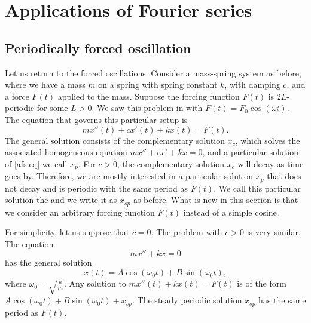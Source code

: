 \documentclass[12pt]{book}
\begin{document}

\sectionnewpage
\section{Applications of Fourier series}


\subsection{Periodically forced oscillation}

\begin{diffyfloatingfigure}{2.0in}{2.3in}
\noindent
{}
\end{diffyfloatingfigure}
Let us return to the forced oscillations.  Consider a mass-spring system as
before, where we have a mass $m$
on a spring with spring constant $k$,
with damping $c$, and a force $F(t)$ applied to the mass.  Suppose 
the forcing function $F(t)$ is $2L$-periodic for some $L > 0$.
We saw
this problem in  with $F(t) = F_0 \cos (\omega t)$.  The
equation that governs this particular setup is
\begin{equation} \label{afs:eq}
mx''(t) + cx'(t) + kx(t) = F(t) .
\end{equation}
The general solution consists of the complementary solution $x_c$, which
solves the associated homogeneous equation $mx'' + cx' + kx = 0$, and
a particular solution of \eqref{afs:eq} we call $x_p$.  For $c > 0$,
the complementary solution $x_c$ will decay as time goes by.
Therefore,
we are mostly interested
in a particular solution $x_p$ that does not decay
and is periodic with the same period as $F(t)$.  We call this particular
solution
the \emph{} and we write it as $x_{sp}$ as before.
What is new in this section is that we consider an arbitrary
forcing function $F(t)$ instead of a simple cosine.

For simplicity, let us suppose that $c=0$.  The problem with $c > 0$ is very
similar.
The equation
\begin{equation*}
mx'' + kx = 0 
\end{equation*}
has the general solution
\begin{equation*}
x(t) = A \cos (\omega_0 t) + 
B \sin (\omega_0 t) ,
\end{equation*}
where $\omega_0 = \sqrt{\frac{k}{m}}$.
Any solution to
$mx''(t) + kx(t) = F(t)$ is of the form
$A \cos (\omega_0 t) + B \sin (\omega_0 t) + x_{sp}$.
The steady
periodic solution $x_{sp}$ has the same period as $F(t)$.
\end{document}
